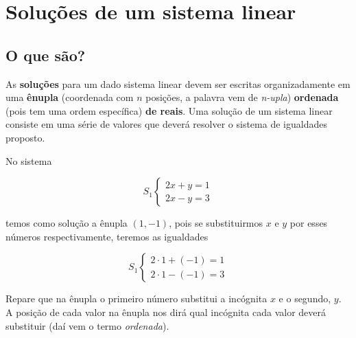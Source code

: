 \chapter{Soluções de um sistema linear}

\section{O que são?}

As \textbf{soluções} para um dado sistema linear devem ser escritas organizadamente em uma \textbf{ênupla} (coordenada com $n$ posições, a palavra vem de \textit{n-upla}) \textbf{ordenada} (pois tem uma ordem específica) \textbf{de reais}. Uma solução de um sistema linear consiste em uma série de valores que deverá resolver o sistema de igualdades proposto.

\Example

No sistema

$$
S_1\begin{cases}
2x+y=1\\
2x-y=3
\end{cases}
$$

temos como solução a ênupla $(1, -1)$, pois se substituirmos $x$ e $y$ por esses números respectivamente, teremos as igualdades

$$
S_1\begin{cases}
2\cdot 1 + (-1)=1\\
2\cdot 1-(-1)= 3
\end{cases}
$$

Repare que na ênupla o primeiro número substitui a incógnita $x$ e o segundo, $y$. A posição de cada valor na ênupla nos dirá qual incógnita cada valor deverá substituir (daí vem o termo \textit{ordenada}).
